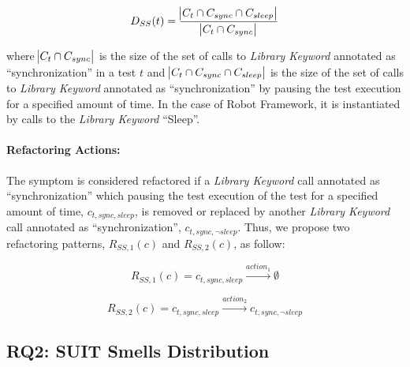 \begin{equation*}
    D_{SS}(t) = \frac{\abs{C_{t} \cap C_{sync} \cap C_{sleep}}}{\abs{C_{t} \cap C_{sync}}}
\end{equation*}

where $\abs{C_{t} \cap C_{sync}}$ is the size of the set of calls to \emph{Library Keyword} annotated as ``synchronization'' in a test $t$ and $\abs{C_{t} \cap C_{sync} \cap C_{sleep}}$ is the size of the set of calls to \emph{Library Keyword} annotated as ``synchronization'' by pausing the test execution for a specified amount of time. In the case of Robot Framework, it is instantiated by calls to the \emph{Library Keyword} ``Sleep''.

\paragraph{Refactoring Actions:}

The symptom is considered refactored if a \emph{Library Keyword} call annotated as ``synchronization'' which pausing the test execution of the test for a specified amount of time, $c_{t,sync,sleep}$, is removed or replaced by another \emph{Library Keyword} call annotated as ``synchronization'', $c_{t,sync, \neg sleep}$. Thus, we propose two refactoring patterns, $R_{SS, 1}(c)$ and $R_{SS, 2}(c)$, as follow:

\begin{equation*}
    R_{SS, 1}(c) = c_{t,sync,sleep} \xrightarrow{action_1} \emptyset
\end{equation*}

\begin{equation*}
    R_{SS,2}(c) = c_{t,sync,sleep} \xrightarrow{action_2} c_{t,sync, \neg sleep}
\end{equation*}


\subsection{RQ2: SUIT Smells Distribution}
\label{sec:results-smells-diffusion}

